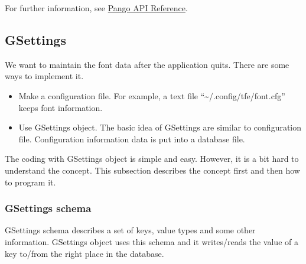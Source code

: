 For further information, see \href{https://docs.gtk.org/Pango/}{Pango
API Reference}.

\hypertarget{gsettings}{%
\subsection{GSettings}\label{gsettings}}

We want to maintain the font data after the application quits. There are
some ways to implement it.

\begin{itemize}
\tightlist
\item
  Make a configuration file. For example, a text file
  ``\textasciitilde/.config/tfe/font.cfg'' keeps font information.
\item
  Use GSettings object. The basic idea of GSettings are similar to
  configuration file. Configuration information data is put into a
  database file.
\end{itemize}

The coding with GSettings object is simple and easy. However, it is a
bit hard to understand the concept. This subsection describes the
concept first and then how to program it.

\hypertarget{gsettings-schema}{%
\subsubsection{GSettings schema}\label{gsettings-schema}}

GSettings schema describes a set of keys, value types and some other
information. GSettings object uses this schema and it writes/reads the
value of a key to/from the right place in the database.

